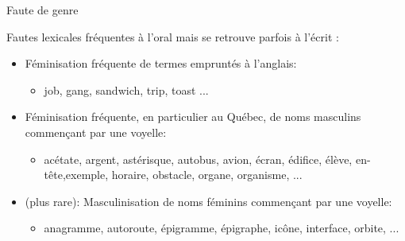 \documentclass[french]{beamer}
\begin{document}
\begin{frame}{Faute de genre}

Fautes lexicales fréquentes à l'oral mais se retrouve parfois à l'écrit : 
\begin{itemize}
	\item Féminisation fréquente de termes empruntés à l'anglais: 
	\begin{itemize}
		\item job, gang, sandwich, trip, toast ...
	\end{itemize}
	\item Féminisation fréquente, en particulier au Québec, de noms masculins commençant par une voyelle:  
	\begin{itemize}
		\item acétate,  argent,  astérisque,  autobus,  avion,  écran,  édifice,  élève,  en-tête,exemple, horaire, obstacle, organe, organisme, ...
	\end{itemize}
	\item (plus  rare):  Masculinisation  de  noms  féminins  commençant  par  une  voyelle:
	\begin{itemize}
		\item anagramme, autoroute, épigramme, épigraphe, icône, interface, orbite, ...
	\end{itemize}
\end{itemize}
\end{frame}
\end{document}
